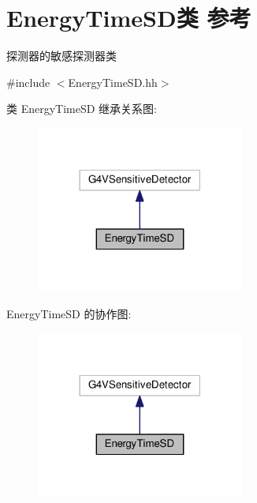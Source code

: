 \hypertarget{classEnergyTimeSD}{}\section{Energy\+Time\+S\+D类 参考}
\label{classEnergyTimeSD}


探测器的敏感探测器类  




{\ttfamily \#include $<$Energy\+Time\+S\+D.\+hh$>$}



类 Energy\+Time\+SD 继承关系图\+:\nopagebreak
\begin{figure}[H]
\begin{center}
\leavevmode
\includegraphics[width=194pt]{classEnergyTimeSD__inherit__graph}
\end{center}
\end{figure}


Energy\+Time\+SD 的协作图\+:\nopagebreak
\begin{figure}[H]
\begin{center}
\leavevmode
\includegraphics[width=194pt]{classEnergyTimeSD__coll__graph}
\end{center}
\end{figure}
